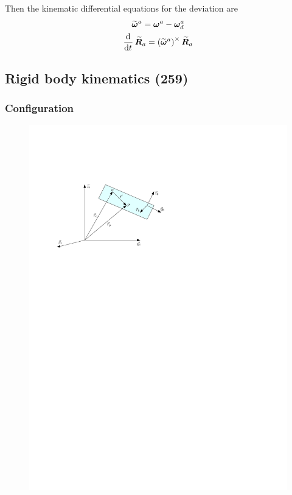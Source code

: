 \documentclass[a4paper, 12pt]{article}
\begin{document}
Then the kinematic differential equations for the deviation are
\begin{gather}
	\widetilde{\angvel}^a = \angvel^a - \angvel^a_d \\
	\dod{}{t} \widetilde{\R}_a = \left( \widetilde{\angvel}^a \right)^\times \widetilde{\R}_a
\end{gather}

\subsection{Rigid body kinematics (259)}
\subsubsection{Configuration}
\begin{figure}[H]
	\centering
	\includegraphics{rigid_body}
\end{figure}
\end{document}

